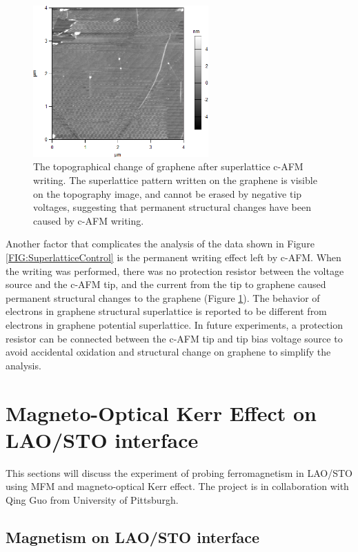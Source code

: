 \documentclass[pdflatex, sectionletters, 12pt]{pittetd}    %
\begin{document}
\begin{figure}[h!]
	\centering
	\includegraphics[width=0.6\textwidth]{Drawing/SuperlatticeDamage.png}
	\caption{The topographical change of graphene after superlattice c-AFM writing. The superlattice pattern written on the graphene is visible on the topography image, and cannot be erased by negative tip voltages, suggesting that permanent structural changes have been caused by c-AFM writing.}
	\label{FIG:SuperlatticeDamage}
\end{figure}

Another factor that complicates the analysis of the data shown in Figure \ref{FIG:SuperlatticeControl} is the permanent writing effect left by c-AFM. When the writing was performed, there was no protection resistor between the voltage source and the c-AFM tip, and the current from the tip to graphene caused permanent structural changes to the graphene (Figure \ref{FIG:SuperlatticeDamage}). The behavior of electrons in graphene structural superlattice is reported to be different from electrons in graphene potential superlattice\cite{jessen2019lithographic}. In future experiments, a protection resistor can be connected between the c-AFM tip and tip bias voltage source to avoid accidental oxidation and structural change on graphene to simplify the analysis.

\chapter{Magneto-Optical Kerr Effect on LAO/STO interface}
\label{SEC:Kerr}

This sections will discuss the experiment of probing ferromagnetism in LAO/STO using MFM and magneto-optical Kerr effect. The project is in collaboration with Qing Guo from University of Pittsburgh.

\section{Magnetism on LAO/STO interface}
\end{document}

